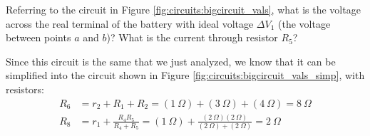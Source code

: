 \begin{example}{Referring to the circuit in Figure \ref{fig:circuits:bigcircuit_vals}, what is the voltage across the real terminal of the battery with ideal voltage $\Delta V_1$ (the voltage between points $a$ and $b$)? What is the current through resistor $R_5$?}


Since this circuit is the same that we just analyzed, we know that it can be simplified into the circuit shown in Figure \ref{fig:circuits:bigcircuit_vals_simp}, with resistors:
\begin{align*}
R_6&=r_2+R_1+R_2=(\SI{1}{\Omega})+(\SI{3}{\Omega})+(\SI{4}{\Omega})=\SI{8}{\Omega}\\
R_8&=r_1+\frac{R_4R_5}{R_4+R_5}=(\SI{1}{\Omega})+\frac{(\SI{2}{\Omega})(\SI{2}{\Omega})}{(\SI{2}{\Omega})+(\SI{2}{\Omega})}=\SI{2}{\Omega}
\end{align*}



\end{example}
